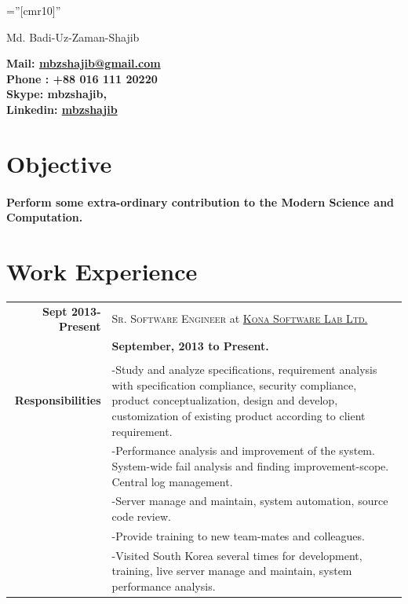 \documentclass[a4paper,10pt]{article}
\newcommand{\myfullname}{Md. Badi-Uz-Zaman-Shajib}
\newcommand{\kslwithlink}{\textsc{\href{www.konai.com}{Kona Software Lab Ltd.}}}
\begin{document}
\pagestyle{empty} %

\font\fb=''[cmr10]'' %

\par{\centering
		{\Huge \myfullname
	}\par}


\par{\centering
		{
		 \bf{Mail}: \href{mailto:mbzshajib@gmail.com}{mbzshajib@gmail.com}\\
		 \bf{Phone} : +88 016 111 20220\\
		 \bf{Skype}: mbzshajib,\\
		 \bf{Linkedin}: \href{https://www.linkedin.com/in/mbzshajib}{mbzshajib}\\
	}\bigskip\par}
\section*{Objective}
\paragraph{}
\textbf{Perform some extra-ordinary contribution to the Modern Science and Computation.}
\section*{Work Experience}
\begin{tabular}{r|p{12.5cm}}					  
\textbf{Sept 2013-Present}		&\textsc{Sr. Software Engineer} at \kslwithlink\\
							&\textbf{September, 2013 to Present.}\\\\
							
\textbf{Responsibilities}	& -Study and analyze specifications, requirement analysis with specification compliance, security compliance, product conceptualization, design and develop, customization of existing product according to client requirement.\\
							& -Performance analysis and improvement of the system. System-wide fail analysis and finding improvement-scope. Central log management.\\
							& -Server manage and maintain, system automation, source code review.\\
							& -Provide training to new team-mates and colleagues.\\
							& -Visited South Korea several times for development, training, live server manage and maintain, system performance analysis.\\						
\end{tabular}
\end{document}
